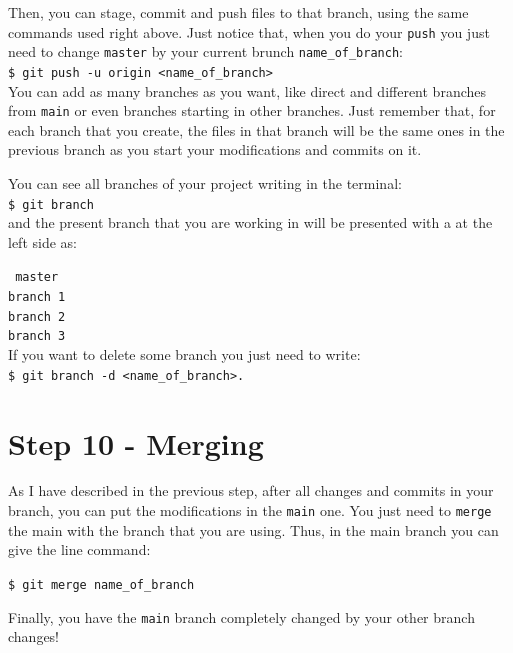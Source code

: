 \documentclass[12pt,a4paper,titlepage,brazil]{article}
\begin{document}
{Then, you can stage, commit and push files to that branch, using the same commands used right above. Just notice that, when you do your \texttt{push} you just need to change \texttt{master} by your current brunch \texttt{name\_of\_branch}:\\

\texttt{\$ git push -u origin <name\_of\_branch>}\\

You can add as many branches as you want, like direct and different branches from \texttt{main} or even branches starting in other branches. Just remember that, for each branch that you create, the files in that branch will be the same ones in the previous branch as you start your modifications and commits on it.

You can see all branches of your project writing in the terminal:\\

\texttt{\$ git branch}\\

and the present branch that you are working in will be presented with a \* at the left side as:

\texttt{\* master}\\

\texttt{branch 1}\\

\texttt{branch 2}\\

\texttt{branch 3}\\

If you want to delete some branch you just need to write:\\

\texttt{\$ git branch -d <name\_of\_branch>.}


\section{Step 10 - Merging}

As I have described in the previous step, after all changes and commits in your branch, you can put the modifications in the \texttt{main} one. You just need to \texttt{merge} the main with the branch that you are using. Thus, in the main branch you can give the line command:

\texttt{\$ git merge name\_of\_branch}

Finally, you have the \texttt{main} branch completely changed by your other branch changes!

}
\end{document}
